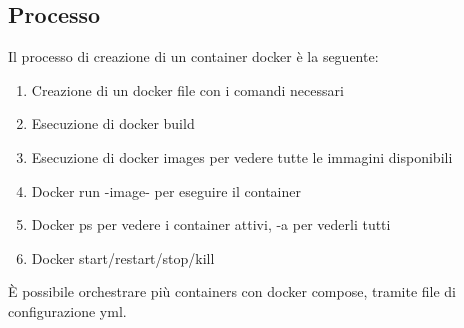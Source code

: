 \subsection{Processo}
Il processo di creazione di un container docker è la seguente:
\begin{enumerate}
    \item Creazione di un docker file con i comandi necessari
    \item Esecuzione di docker build
    \item Esecuzione di docker images per vedere tutte le immagini disponibili
    \item Docker run -image- per eseguire il container
    \item Docker ps per vedere i container attivi, -a per vederli tutti
    \item Docker start/restart/stop/kill
\end{enumerate}
È possibile orchestrare più containers con docker compose, tramite file di configurazione
yml.